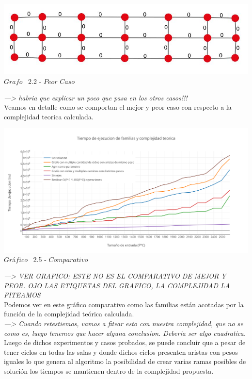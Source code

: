 \vspace*{0.3cm} \vspace*{0.3cm}
  \begin{center}
 \includegraphics[scale=0.5]{./EJ2/ej2grafosinpared.jpeg}
 \\{$Grafo$ \ 2.2 - $Peor$ $Caso$}
  \end{center}
  \vspace*{0.3cm}
  
\textit{---> habria que explicar un poco que pasa en los otros casos!!!}\\
  
Veamos en detalle como se comportan el mejor y peor caso con respecto a la complejidad teorica calculada.\\

\vspace*{0.3cm} \vspace*{0.3cm}
  \begin{center}
\includegraphics[scale=0.65]{./EJ2/comparativo1.png}
 {$Gr$\'a$fico$ \ 2.5 - $Comparativo$}
  \end{center}
  \vspace*{0.3cm}
  
\textit{---> VER GRAFICO: ESTE NO ES EL COMPARATIVO DE MEJOR Y PEOR. OJO LAS ETIQUETAS DEL GRAFICO, LA COMPLEJIDAD LA FITEAMOS}\\  
  
Podemos ver en este gr\'afico comparativo como las familias est\'an acotadas por la funci\'on de la complejidad te\'orica calculada.\\

\textit{---> Cuando retestiemos, vamos a fitear esto con nuestra complejidad, que no se como es, luego tenemos que hacer alguna conclusion. Deberia ser algo cuadratica.}\\
  
Luego de dichos experimentos y casos probados, se puede concluir que a pesar de tener ciclos en todas las salas y donde dichos ciclos presenten aristas con pesos iguales lo que genera al algoritmo la posibilidad de crear varias ramas posibles de soluci\'on los tiempos se mantienen dentro de la complejidad propuesta.\\
